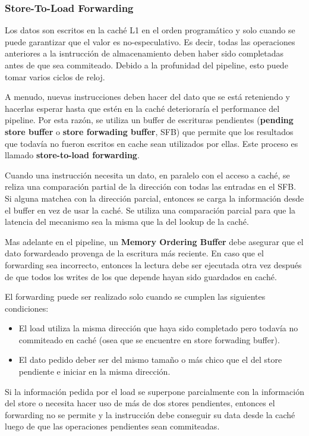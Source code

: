\subsubsection*{Store-To-Load Forwarding}\label{sec::Intel::NetBurst::FrontEnd::Forwarding}
Los datos son escritos en la caché L1 en el orden programático y solo cuando se puede garantizar que el valor es no-especulativo. Es decir, todas las operaciones anteriores a la isntrucción de almacenamiento deben haber sido completadas antes de que sea commiteado. Debido a la profunidad del pipeline, esto puede tomar varios ciclos de reloj.

A menudo, nuevas instrucciones deben hacer del dato que se está reteniendo y hacerlas esperar hasta que estén en la caché deterioraría el performance del pipeline. Por esta razón, se utiliza un buffer de escrituras pendientes (\textbf{pending store buffer} o \textbf{store forwading buffer}, SFB) que permite que los resultados que todavía no fueron escritos en cache sean utilizados por ellas. Este proceso es llamado \textbf{store-to-load forwarding}.

Cuando una instrucción necesita un dato, en paralelo con el acceso a caché, se reliza una comparación partial de la dirección con todas las entradas en el SFB. Si alguna matchea con la dirección parcial, entonces se carga la información desde el buffer en vez de usar la caché. Se utiliza una comparación parcial para que la latencia del mecanismo sea la misma que la del lookup de la caché.

Mas adelante en el pipeline, un \textbf{Memory Ordering Buffer} debe asegurar que el dato forwardeado provenga de la escritura más reciente. En caso que el forwarding sea incorrecto, entonces la lectura debe ser ejecutada otra vez después de que todos los writes de los que depende hayan sido guardados en caché.

El forwarding puede ser realizado solo cuando se cumplen las siguientes condiciones:
\begin{itemize}
	\item El load utiliza la misma dirección que haya sido completado pero todavía no commiteado en caché (osea que se encuentre en store forwading buffer).
	\item El dato pedido deber ser del mismo tamaño o más chico que el del store pendiente e iniciar en la misma dirección.
\end{itemize}

Si la información pedida por el load se superpone parcialmente con la información del store o necesita hacer uso de más de dos stores pendientes, entonces el forwarding no se permite y  la instrucción debe conseguir su data desde la caché luego de que las operaciones pendientes sean commiteadas.


